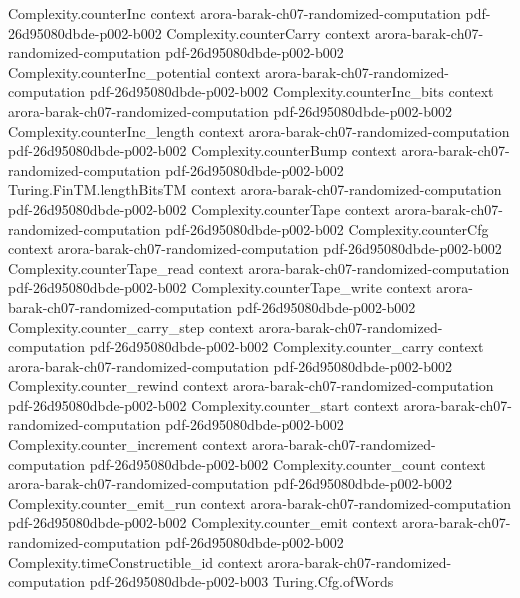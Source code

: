 \begin{theorem}
\proofstep
  {Complexity.counterInc}
  {context}
  {arora-barak-ch07-randomized-computation}
  {pdf-26d95080dbde-p002-b002}
\proofstep
  {Complexity.counterCarry}
  {context}
  {arora-barak-ch07-randomized-computation}
  {pdf-26d95080dbde-p002-b002}
\proofstep
  {Complexity.counterInc_potential}
  {context}
  {arora-barak-ch07-randomized-computation}
  {pdf-26d95080dbde-p002-b002}
\proofstep
  {Complexity.counterInc_bits}
  {context}
  {arora-barak-ch07-randomized-computation}
  {pdf-26d95080dbde-p002-b002}
\proofstep
  {Complexity.counterInc_length}
  {context}
  {arora-barak-ch07-randomized-computation}
  {pdf-26d95080dbde-p002-b002}
\proofstep
  {Complexity.counterBump}
  {context}
  {arora-barak-ch07-randomized-computation}
  {pdf-26d95080dbde-p002-b002}
\proofstep
  {Turing.FinTM.lengthBitsTM}
  {context}
  {arora-barak-ch07-randomized-computation}
  {pdf-26d95080dbde-p002-b002}
\proofstep
  {Complexity.counterTape}
  {context}
  {arora-barak-ch07-randomized-computation}
  {pdf-26d95080dbde-p002-b002}
\proofstep
  {Complexity.counterCfg}
  {context}
  {arora-barak-ch07-randomized-computation}
  {pdf-26d95080dbde-p002-b002}
\proofstep
  {Complexity.counterTape_read}
  {context}
  {arora-barak-ch07-randomized-computation}
  {pdf-26d95080dbde-p002-b002}
\proofstep
  {Complexity.counterTape_write}
  {context}
  {arora-barak-ch07-randomized-computation}
  {pdf-26d95080dbde-p002-b002}
\proofstep
  {Complexity.counter_carry_step}
  {context}
  {arora-barak-ch07-randomized-computation}
  {pdf-26d95080dbde-p002-b002}
\proofstep
  {Complexity.counter_carry}
  {context}
  {arora-barak-ch07-randomized-computation}
  {pdf-26d95080dbde-p002-b002}
\proofstep
  {Complexity.counter_rewind}
  {context}
  {arora-barak-ch07-randomized-computation}
  {pdf-26d95080dbde-p002-b002}
\proofstep
  {Complexity.counter_start}
  {context}
  {arora-barak-ch07-randomized-computation}
  {pdf-26d95080dbde-p002-b002}
\proofstep
  {Complexity.counter_increment}
  {context}
  {arora-barak-ch07-randomized-computation}
  {pdf-26d95080dbde-p002-b002}
\proofstep
  {Complexity.counter_count}
  {context}
  {arora-barak-ch07-randomized-computation}
  {pdf-26d95080dbde-p002-b002}
\proofstep
  {Complexity.counter_emit_run}
  {context}
  {arora-barak-ch07-randomized-computation}
  {pdf-26d95080dbde-p002-b002}
\proofstep
  {Complexity.counter_emit}
  {context}
  {arora-barak-ch07-randomized-computation}
  {pdf-26d95080dbde-p002-b002}
\proofstep
  {Complexity.timeConstructible_id}
  {context}
  {arora-barak-ch07-randomized-computation}
  {pdf-26d95080dbde-p002-b003}
\proofstep
  {Turing.Cfg.ofWords}

\end{theorem}
